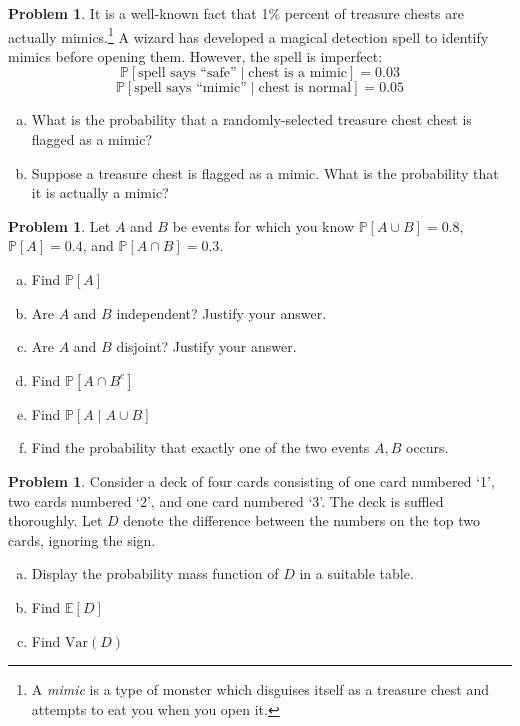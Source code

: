 \documentclass[10pt]{article}
\theoremstyle{definition}
\newtheorem{problem}[theorem]{Problem}
\newcommand{\1}[1]{\textbf{1}_{\left[#1\right]}} %
\def\E{\mathbb{E}} %
\def\P{\mathbb{P}} %
\def\Var{\mathrm{Var}} %
\begin{document}
\begin{problem}%
  It is a well-known fact that 1\% percent of treasure chests are actually
  mimics.\footnote{A \textit{mimic} is a type of monster which disguises
    itself as a treasure chest and attempts to eat you when you open it.} A
  wizard has developed a magical detection spell to identify mimics before
  opening them. However, the spell is imperfect:
  \begin{equation*}
    \P\left[\text{spell says ``safe''} \mid \text{chest is a mimic} \right] = 0.03
  \end{equation*}
  \begin{equation*}
    \P\left[\text{spell says ``mimic''} \mid \text{chest is normal} \right] = 0.05
  \end{equation*}

  \begin{enumerate}[(a)]
    \item What is the probability that a randomly-selected treasure chest
    chest is flagged as a mimic?
    \item Suppose a treasure chest is flagged as a mimic. What is the
    probability that it is actually a mimic?
  \end{enumerate}
\end{problem}

\begin{problem}%
  Let $A$ and $B$ be events for which you know $\P\left[A\cup B \right]=0.8$, $\P\left[A \right]=0.4$,
  and $\P\left[A\cap B \right] = 0.3$.
  \begin{enumerate}[(a)]
    \item Find $\P\left[A \right]$ %
    \item Are $A$ and $B$ independent? Justify your answer.
    \item Are $A$ and $B$ disjoint? Justify your answer.
    \item Find $\P\left[A\cap B^{c} \right]$
    \item Find $\P\left[A\mid A\cup B \right]$
    \item Find the probability that exactly one of the two events $A,B$ occurs.
  \end{enumerate}
\end{problem}


\begin{problem}%
  Consider a deck of four cards consisting of one card numbered `1', two cards
  numbered `2', and one card numbered `3'. The deck is suffled thoroughly. Let
  $D$ denote the difference between the numbers on the top two cards, ignoring
  the sign.
  \begin{enumerate}[(a)]
    \item Display the probability mass function of $D$ in a suitable table.
    \item Find $\E\left[D \right]$
    \item Find $\Var(D)$
  \end{enumerate}
\end{problem}
\end{document}
